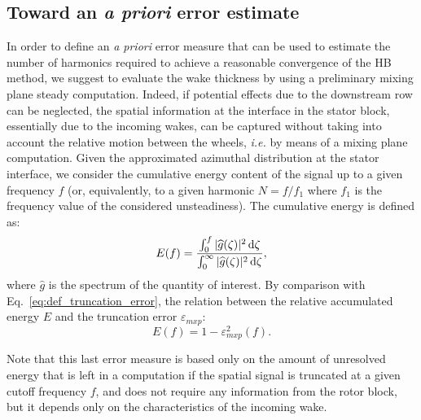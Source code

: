 \subsection{Toward an \emph{a priori} error estimate}
In order to define an \emph{a priori} error measure 
that can be used to estimate the number of 
harmonics required to achieve a reasonable 
convergence of the HB method, we suggest to 
evaluate the wake thickness by using a preliminary 
mixing plane steady computation. Indeed, if 
potential effects due to the downstream row can 
be neglected, the spatial information at the interface 
in the stator block, essentially due to the incoming 
wakes, can be captured without taking into account 
the relative motion between the wheels, \emph{i.e.} 
by means of a mixing plane computation. 
Given the approximated azimuthal distribution at 
the stator interface, we consider the cumulative
energy content of the signal up to a given frequency $f$ 
(or, equivalently, to a given harmonic $N=f/f_1$ where $f_1$ is the
frequency value of the considered unsteadiness). 
The cumulative energy is defined as:
\begin{equation}
    E(f) = \frac{
      \int_0^f | \widehat{g}(\zeta)|^2 \mathop{}\!\mathrm{d} \zeta
    }{
      \int_0^\infty | \widehat{g}(\zeta)|^2 \mathop{}\!\mathrm{d} \zeta
    },
\end{equation}
where $\widehat{g}$ is the spectrum of the quantity of interest.
By comparison with Eq.~\eqref{eq:def_truncation_error},
the relation between the relative accumulated energy $E$
and the truncation error $\varepsilon_{mxp}$:
\begin{equation}
    E(f) = 1 - \varepsilon_{mxp}^2 (f).
    \label{eq:correspond_E_error}
\end{equation}


Note that this last error measure is based only on 
the amount of unresolved energy that is left 
in a computation if the spatial signal is 
truncated at a given cutoff frequency $f$, 
and does not require any information from the rotor
block, but it depends only on the characteristics 
of the incoming wake.

